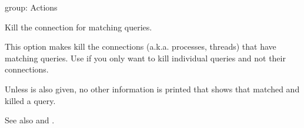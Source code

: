 \documentclass[letterpaper,10pt,english]{sphinxmanual}
\begin{document}
\begin{fulllineitems}
\label{\detokenize{mariadb-kill:cmdoption-mariadb-kill-kill}}
\sphinxAtStartPar
group: Actions

\sphinxAtStartPar
Kill the connection for matching queries.

\sphinxAtStartPar
This option makes  kill the connections (a.k.a. processes, threads) that
have matching queries.  Use {\hyperref[\detokenize{mariadb-kill:cmdoption-mariadb-kill-kill-query}]{}} if you only want to kill
individual queries and not their connections.

\sphinxAtStartPar
Unless {\hyperref[\detokenize{mariadb-kill:cmdoption-mariadb-kill-print}]{}} is also given, no other information is printed that shows
that  matched and killed a query.

\sphinxAtStartPar
See also {\hyperref[\detokenize{mariadb-kill:cmdoption-mariadb-kill-wait-before-kill}]{}} and {\hyperref[\detokenize{mariadb-kill:cmdoption-mariadb-kill-wait-after-kill}]{}}.

\end{fulllineitems}

\end{document}
